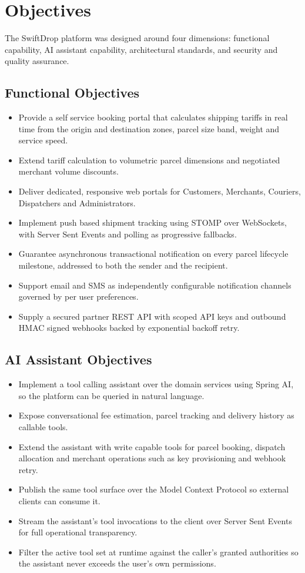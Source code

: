 \documentclass[11pt,a4paper,oneside,openany]{report}
\begin{document}
\section{Objectives}
The SwiftDrop platform was designed around four dimensions: functional capability, AI assistant
capability, architectural standards, and security and quality assurance.

\subsection{Functional Objectives}
\begin{itemize}[leftmargin=*]
\item Provide a self service booking portal that calculates shipping tariffs in real time from the
origin and destination zones, parcel size band, weight and service speed.
\item Extend tariff calculation to volumetric parcel dimensions and negotiated merchant volume
discounts.
\item Deliver dedicated, responsive web portals for Customers, Merchants, Couriers, Dispatchers and
Administrators.
\item Implement push based shipment tracking using STOMP over WebSockets, with Server Sent Events
and polling as progressive fallbacks.
\item Guarantee asynchronous transactional notification on every parcel lifecycle milestone,
addressed to both the sender and the recipient.
\item Support email and SMS as independently configurable notification channels governed by per
user preferences.
\item Supply a secured partner REST API with scoped API keys and outbound HMAC signed webhooks
backed by exponential backoff retry.
\end{itemize}

\subsection{AI Assistant Objectives}
\begin{itemize}[leftmargin=*]
\item Implement a tool calling assistant over the domain services using Spring AI, so the platform
can be queried in natural language.
\item Expose conversational fee estimation, parcel tracking and delivery history as callable tools.
\item Extend the assistant with write capable tools for parcel booking, dispatch allocation and
merchant operations such as key provisioning and webhook retry.
\item Publish the same tool surface over the Model Context Protocol so external clients can consume
it.
\item Stream the assistant's tool invocations to the client over Server Sent Events for full
operational transparency.
\item Filter the active tool set at runtime against the caller's granted authorities so the
assistant never exceeds the user's own permissions.
\end{itemize}
\end{document}
